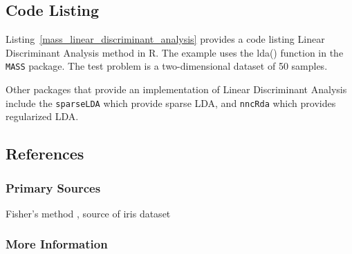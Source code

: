 \subsection{Code Listing}
Listing~\ref{mass_linear_discriminant_analysis} provides a code listing Linear Discriminant Analysis method in R.
The example uses the {lda()} function in the \texttt{MASS} package.
The test problem is a two-dimensional dataset of 50 samples.



Other packages that provide an implementation of Linear Discriminant Analysis include the \texttt{sparseLDA} which provide sparse LDA, and \texttt{nncRda} which provides regularized LDA.




\subsection{References}

\subsubsection{Primary Sources}

Fisher's method \cite{Fisher1936}, source of iris dataset


\subsubsection{More Information}





